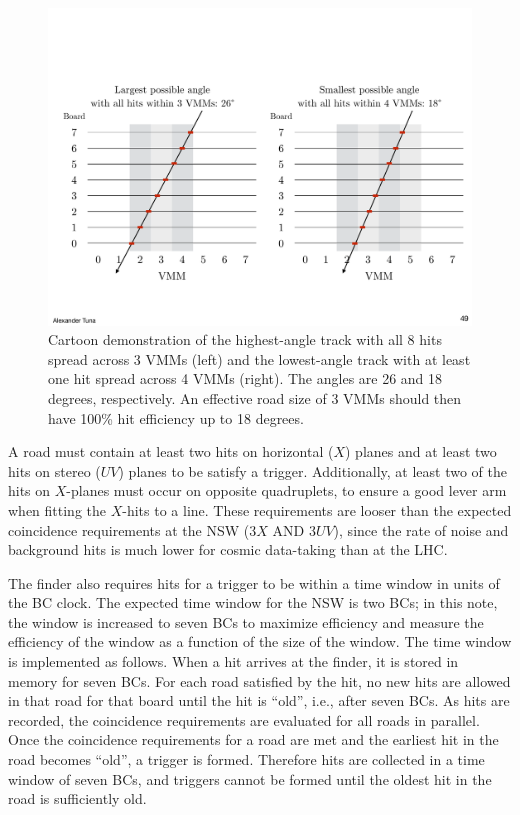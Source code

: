 \begin{figure}[!htpb]
  \begin{center}
    \includegraphics[width=1.0\textwidth]{figures/cartoons/cartoon_road_efficiency}
  \end{center}
  \vspace{-20pt}
  \caption{Cartoon demonstration of the highest-angle track with all 8 hits spread across 3 VMMs (left) and the lowest-angle track with at least one hit spread across 4 VMMs (right). The angles are 26 and 18 degrees, respectively. An effective road size of 3 VMMs should then have 100\% hit efficiency up to 18 degrees.}
  \label{fig:cartoon_road_efficiency}
\end{figure}

A road must contain at least two hits on horizontal ($X$) planes and at least two hits on stereo ($UV$) planes to be satisfy a trigger. Additionally, at least two of the hits on $X$-planes must occur on opposite quadruplets, to ensure a good lever arm when fitting the $X$-hits to a line. These requirements are looser than the expected coincidence requirements at the NSW ($3X$ AND $3UV$), since the rate of noise and background hits is much lower for cosmic data-taking than at the LHC.

The finder also requires hits for a trigger to be within a time window in units of the BC clock. The expected time window for the NSW is two BCs; in this note, the window is increased to seven BCs to maximize efficiency and measure the efficiency of the window as a function of the size of the window. The time window is implemented as follows. When a hit arrives at the finder, it is stored in memory for seven BCs. For each road satisfied by the hit, no new hits are allowed in that road for that board until the hit is ``old'', i.e., after seven BCs. As hits are recorded, the coincidence requirements are evaluated for all roads in parallel. Once the coincidence requirements for a road are met and the earliest hit in the road becomes ``old'', a trigger is formed. Therefore hits are collected in a time window of seven BCs, and triggers cannot be formed until the oldest hit in the road is sufficiently old.

